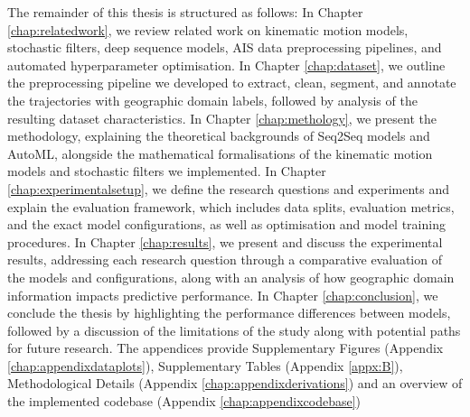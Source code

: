 The remainder of this thesis is structured as follows:
In Chapter \ref{chap:relatedwork}, we review related work on kinematic motion models, stochastic filters, deep sequence models, \ac{AIS} data preprocessing pipelines, and automated hyperparameter optimisation.
In Chapter \ref{chap:dataset}, we outline the preprocessing pipeline we developed to extract, clean, segment, and annotate the trajectories with geographic domain labels, followed by analysis of the resulting dataset characteristics.
In Chapter \ref{chap:methology}, we present the methodology,
explaining the theoretical backgrounds of \ac{Seq2Seq} models and \ac{AutoML}, alongside the mathematical formalisations of the kinematic motion models and stochastic filters we implemented.
In Chapter \ref{chap:experimentalsetup}, we define the research questions and experiments and explain the evaluation framework,  which includes data splits, evaluation metrics, and the exact model configurations, as well as optimisation and model training procedures.
In Chapter \ref{chap:results}, we present and discuss the experimental results, addressing each research question through a comparative evaluation of the models and configurations, along with an analysis of how geographic domain information impacts predictive performance.
In Chapter \ref{chap:conclusion}, we conclude the thesis by highlighting the performance differences between models, followed by a discussion of the limitations of the study along with potential paths for future research.
The appendices provide Supplementary Figures (Appendix \ref{chap:appendixdataplots}), Supplementary Tables (Appendix \ref{appx:B}), Methodological Details (Appendix \ref{chap:appendixderivations}) and an overview of the implemented codebase (Appendix \ref{chap:appendixcodebase}) 

